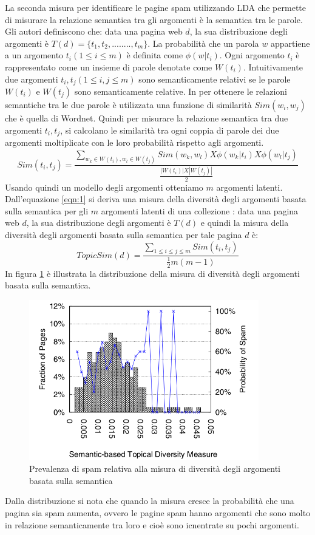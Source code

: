 La seconda misura per identificare le pagine spam utilizzando LDA che permette di misurare la relazione semantica tra gli argomenti è  la semantica tra le parole. Gli autori definiscono che: data una pagina web \(d\), la sua distribuzione degli argomenti è \(T(d)=\{t_1,t_2,........,t_m\}\). La probabilità che un parola \(w\) appartiene a un argomento \(t_i (1 \leq i \leq m )\) è definita come \(\phi(w|t_i)\). Ogni argomento \(t_i\) è rappresentato come un insieme di parole denotate come \(W(t_i)\). Intuitivamente due argomenti \(t_i, t_j (1 \leq i, j \leq m)\) sono semanticamente relativi se le parole \(W(t_i)\) e \(W(t_j)\) sono semanticamente relative. In \cite{Dong:2012:EDC:2457524.2457693} per ottenere le relazioni semantiche tra le due parole è utilizzata una funzione di similarità \(Sim(w_i,w_j)\) che è quella di Wordnet. Quindi per misurare la relazione semantica tra due argomenti \(t_i,t_j\), si calcolano le similarità tra ogni coppia di parole dei due argomenti moltiplicate con le loro probabilità rispetto agli argomenti.
\begin{equation}
\label{eqn:1}
Sim(t_i,t_j) = \frac{\sum_{w_k \in W(t_i),w_l \in W(t_j)}Sim(w_k,w_l) X \phi(w_k|t_i) X \phi(w_l|t_j)}{\frac{|W(t_i)| X |W(t_j)|}{2}}	
\end{equation}
Usando quindi un modello degli argomenti otteniamo \(m\) argomenti latenti. Dall'equazione \ref{eqn:1} si deriva una misura della diversità degli argomenti basata sulla semantica per gli \(m\) argomenti latenti di una collezione \cite{Dong:2012:EDC:2457524.2457693}: data una pagina web \(d\), la sua distribuzione degli argomenti è \(T(d)\) e quindi la misura della diversità degli argomenti basata sulla semantica per tale pagina \(d\) è:
\begin{equation}
TopicSim(d)=\frac{\sum_{1 \leq i \leq j \leq m} Sim(t_i,t_j)}{\frac{1}{2} m(m-1)}
\end{equation}
In figura \ref{fig:zhou3} è illustrata la distribuzione della misura di diversità degli argomenti basata sulla semantica.
\begin{figure}
\centering
\includegraphics[width=10cm]{immagini/zhou/immagine3}
\caption{Prevalenza di spam relativa alla misura di diversità degli argomenti basata sulla semantica}
\label{fig:zhou3}
\end{figure}
Dalla distribuzione si nota che quando la misura cresce la probabilità che una pagina sia spam aumenta, ovvero le pagine spam hanno argomenti che sono molto in relazione semanticamente tra loro e cioè sono icnentrate su pochi argomenti.


